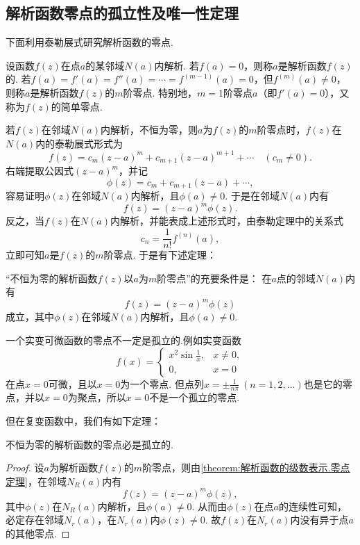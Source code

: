 \subsection{解析函数零点的孤立性及唯一性定理}
下面利用泰勒展式研究解析函数的零点.
\begin{definition}\label{definition:解析函数的级数表示.零点}
设函数\(f(z)\)在点\(a\)的某邻域\(N(a)\)内解析.
若\(f(a)=0\)，则称\(a\)是解析函数\(f(z)\)的.
若\(f(a)=f'(a)=f''(a)=\dotsb=f^{(m-1)}(a)=0\)，但\(f^{(m)}(a)\neq0\)，则称\(a\)是解析函数\(f(z)\)的\(m\)阶零点.
特别地，\(m=1\)阶零点\(a\)（即\(f'(a)=0\)），又称为\(f(z)\)的简单零点.
\end{definition}

若\(f(z)\)在邻域\(N(a)\)内解析，不恒为零，则\(a\)为\(f(z)\)的\(m\)阶零点时，\(f(z)\)在\(N(a)\)内的泰勒展式形式为\[
f(z) = c_m (z-a)^m + c_{m+1} (z-a)^{m+1} + \dotsb \quad(c_m\neq0).
\]右端提取公因式\((z-a)^m\)，并记\[
\phi(z) = c_m + c_{m+1} (z-a) + \dotsb,
\]容易证明\(\phi(z)\)在邻域\(N(a)\)内解析，且\(\phi(a)\neq0\).
于是在邻域\(N(a)\)内有\[
f(z) = (z-a)^m \phi(z).
\]反之，当\(f(z)\)在\(N(a)\)内解析，并能表成上述形式时，由泰勒定理中的关系式\[
c_n = \frac{1}{n!} f^{(n)}(a),
\]立即可知\(a\)是\(f(z)\)的\(m\)阶零点.
于是有下述定理：
\begin{theorem}\label{theorem:解析函数的级数表示.零点定理}
“不恒为零的解析函数\(f(z)\)以\(a\)为\(m\)阶零点”的充要条件是：
在\(a\)点的邻域\(N(a)\)内有\[
f(z) = (z-a)^m \phi(z)
\]成立，其中\(\phi(z)\)在邻域\(N(a)\)内解析，且\(\phi(a)\neq0\).
\end{theorem}

一个实变可微函数的零点不一定是孤立的.例如实变函数\[
f(x) = \left\{ \begin{array}{cl}
x^2 \sin\frac{1}{x}, & x\neq0, \\
0, & x=0
\end{array} \right.
\]在点\(x=0\)可微，且以\(x=0\)为一个零点.
但点列\(x = \pm\frac{1}{n\pi}\ (n=1,2,\dotsc)\)也是它的零点，并以\(x = 0\)为聚点，所以\(x = 0\)不是一个孤立的零点.

但在复变函数中，我们有如下定理：
\begin{theorem}\label{theorem:解析函数的级数表示.解析函数的零点的孤立性}
不恒为零的解析函数的零点必是孤立的.
\begin{proof}
设\(a\)为解析函数\(f(z)\)的\(m\)阶零点，则由\cref{theorem:解析函数的级数表示.零点定理}，在邻域\(N_R(a)\)内有\[
f(z) = (z-a)^m \phi(z),
\]其中\(\phi(z)\)在\(N_R(a)\)内解析，且\(\phi(a)\neq0\).
从而由\(\phi(z)\)在点\(a\)的连续性可知，必定存在邻域\(N_r(a)\)，在\(N_r(a)\)内\(\phi(z)\neq0\).
故\(f(z)\)在\(N_r(a)\)内没有异于点\(a\)的其他零点.
\end{proof}
\end{theorem}

